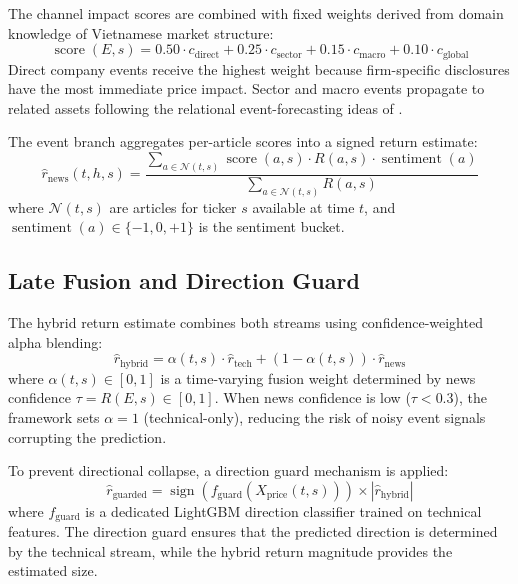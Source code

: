 \documentclass[runningheads]{llncs}
\begin{document}
The channel impact scores are combined with fixed weights derived from domain knowledge of Vietnamese market structure:
\begin{equation}
\operatorname{score}(E, s) = 0.50 \cdot c_{\mathrm{direct}} + 0.25 \cdot c_{\mathrm{sector}} + 0.15 \cdot c_{\mathrm{macro}} + 0.10 \cdot c_{\mathrm{global}}
\label{eqchannel-weights}
\end{equation}
Direct company events receive the highest weight because firm-specific disclosures have the most immediate price impact. Sector and macro events propagate to related assets following the relational event-forecasting ideas of \cite{xu2021rest}.

The event branch aggregates per-article scores into a signed return estimate:
\begin{equation}
\hat{r}_{\mathrm{news}}(t, h, s) = \frac{\sum_{a \in \mathcal{N}(t,s)} \operatorname{score}(a,s) \cdot R(a,s) \cdot \operatorname{sentiment}(a)}{\sum_{a \in \mathcal{N}(t,s)} R(a,s)}
\label{eqr-news-agg}
\end{equation}
where $\mathcal{N}(t,s)$ are articles for ticker $s$ available at time $t$, and $\operatorname{sentiment}(a) \in \{-1, 0, +1\}$ is the sentiment bucket.

\subsection{Late Fusion and Direction Guard}

The hybrid return estimate combines both streams using confidence-weighted alpha blending:
\begin{equation}
\hat{r}_{\mathrm{hybrid}} = \alpha(t, s) \cdot \hat{r}_{\mathrm{tech}} + (1 - \alpha(t, s)) \cdot \hat{r}_{\mathrm{news}}
\label{eqhybrid}
\end{equation}
where $\alpha(t, s) \in [0, 1]$ is a time-varying fusion weight determined by news confidence $\tau = R(E, s) \in [0, 1]$. When news confidence is low ($\tau < 0.3$), the framework sets $\alpha = 1$ (technical-only), reducing the risk of noisy event signals corrupting the prediction.

To prevent directional collapse, a direction guard mechanism is applied:
\begin{equation}
\hat{r}_{\mathrm{guarded}} = \operatorname{sign}(f_{\mathrm{guard}}(X_{\mathrm{price}}(t, s))) \times |\hat{r}_{\mathrm{hybrid}}|
\label{eqguard}
\end{equation}
where $f_{\mathrm{guard}}$ is a dedicated LightGBM direction classifier trained on technical features. The direction guard ensures that the predicted direction is determined by the technical stream, while the hybrid return magnitude provides the estimated size.
\end{document}
